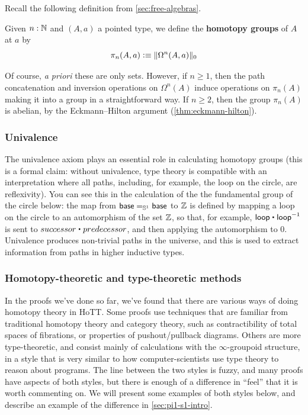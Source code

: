 Recall the following definition from \autoref{sec:free-algebras}.

\begin{defn}\label{def-of-homotopy-groups}
  Given $n:\N$ and $(A,a)$ a pointed type, we define the \textbf{homotopy groups} of $A$
  at $a$ by
  \[\pi_n(A,a)\defeq \trunc0{\Omega^n(A,a)}\]
\end{defn}

Of course, \emph{a priori} these are only sets.
However, if $n\ge 1$, then the path concatenation and inversion operations on $\Omega^n(A)$ induce operations on $\pi_n(A)$ making it into a group in a straightforward way.
If $n\ge 2$, then the group $\pi_n(A)$ is abelian, by the Eckmann--Hilton argument (\autoref{thm:eckmann-hilton}).


\subsubsection{Univalence}  The univalence axiom plays an essential role in
  calculating homotopy groups (this is a formal claim: without
  univalence, type theory is compatible with an interpretation where all
  paths, including, for example, the loop on the circle, are reflexivity).  You
  can see this in the calculation of the the fundamental group of the
  circle below: the map from $\id[\Sn ^1] \base \base$ to $\Z$
  is defined by mapping a loop on the circle to an automorphism of the set
  $\Z$, so that, for example, $\lloop \ct \opp \lloop$ is sent
  to $successor \ct predecessor$, and then applying the automorphism to
  0. Univalence produces non-trivial paths in the universe, and this is
  used to extract information from paths in higher inductive types.

\subsubsection{Homotopy-theoretic and type-theoretic methods}  In the
proofs we've done so far, we've found that there are various ways of
doing homotopy theory in HoTT.  Some proofs use techniques that are
familiar from traditional homotopy theory and category theory, such as
contractibility of total spaces of fibrations, or properties of
pushout/pullback diagrams.  Others are more type-theoretic, and consist
mainly of calculations with the $\infty$-groupoid structure, in a style
that is very similar to how computer-scientists use type theory to
reason about programs.  The line between the two styles is fuzzy, and
many proofs have aspects of both styles, but there is enough of a
difference in ``feel'' that it is worth commenting on.  We will present
some examples of both styles below, and describe an example of the
difference in \autoref{sec:pi1-s1-intro}.

